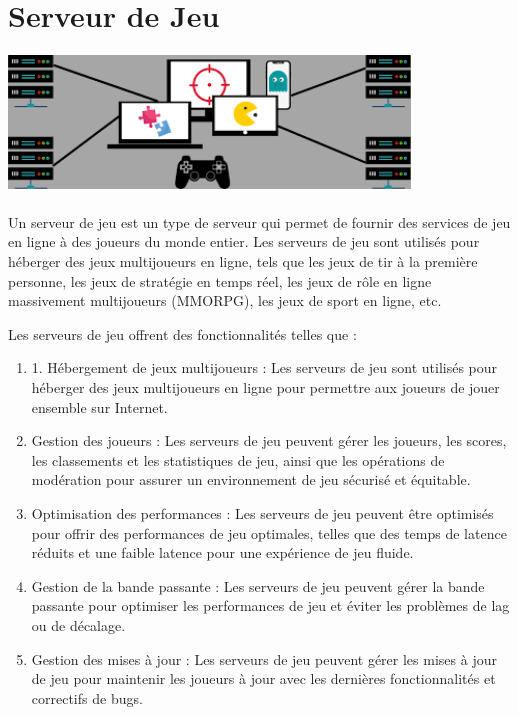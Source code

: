 \section{Serveur de Jeu}
\vspace{4mm}
\paragraph{
	\includegraphics[width=0.8\textwidth]{PhotoMemoire/serveur_jeux.png}}
\paragraph{ }
Un serveur de jeu est un type de serveur qui permet de fournir des services de jeu en ligne à des joueurs du monde entier. Les serveurs de jeu sont utilisés pour héberger des jeux multijoueurs en ligne, tels que les jeux de tir à la première personne, les jeux de stratégie en temps réel, les jeux de rôle en ligne massivement multijoueurs (MMORPG), les jeux de sport en ligne, etc.

Les serveurs de jeu offrent des fonctionnalités telles que :
\begin{enumerate}
	
  \item 1. Hébergement de jeux multijoueurs : Les serveurs de jeu sont utilisés pour héberger des jeux multijoueurs en ligne pour permettre aux joueurs de jouer ensemble sur Internet.
 
 \item  Gestion des joueurs : Les serveurs de jeu peuvent gérer les joueurs, les scores, les classements et les statistiques de jeu, ainsi que les opérations de modération pour assurer un environnement de jeu sécurisé et équitable.
 
 \item  Optimisation des performances : Les serveurs de jeu peuvent être optimisés pour offrir des performances de jeu optimales, telles que des temps de latence réduits et une faible latence pour une expérience de jeu fluide.
 
\item    Gestion de la bande passante : Les serveurs de jeu peuvent gérer la bande passante pour optimiser les performances de jeu et éviter les problèmes de lag ou de décalage.
 
 \item  Gestion des mises à jour : Les serveurs de jeu peuvent gérer les mises à jour de jeu pour maintenir les joueurs à jour avec les dernières fonctionnalités et correctifs de bugs.
 
\end{enumerate}

